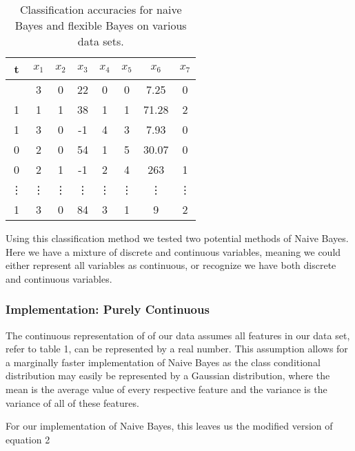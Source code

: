 \documentclass{article}
\begin{document}
\begin{table}[h]
\caption{Classification accuracies for naive Bayes and flexible 
Bayes on various data sets.}
\label{sample-table}
\vskip 0.15in
\begin{center}
\begin{small}
\begin{sc}
\begin{tabular}{|c|c|c|c|c|c|c|c|}
\hline
\abovespace\belowspace
\textbf{t} & $x_1$ & $x_2$ & $x_3$ & $x_4$ & $x_5$ & $x_6$ & $x_7$ \\
\hline
\abovespace
0 & 3 & 0 & 22 & 0 & 0 & 7.25 & 0 \\
1 & 1 & 1 & 38 & 1 & 1 & 71.28 & 2 \\
1 & 3 & 0 & -1 & 4 & 3 & 7.93 & 0 \\
0 & 2 & 0 & 54 & 1 & 5 & 30.07 & 0 \\
0 & 2 & 1 & -1 & 2 & 4 & 263 & 1 \\
\vdots & \vdots & \vdots & \vdots & \vdots & \vdots & \vdots & \vdots \\
1 & 3 & 0 & 84 & 3 & 1 & 9 & 2 \\

\hline
\end{tabular}
\end{sc}
\end{small}
\end{center}
\vskip -0.1in
\end{table}

Using this classification method we tested two potential methods of Naive Bayes. Here we have a mixture of discrete and continuous variables, meaning we could either represent all variables as continuous, or recognize we have both discrete and continuous variables. 

\subsubsection{Implementation: Purely Continuous}
The continuous representation of of our data assumes all features in our data set, refer to table 1, can be represented by a real number. This assumption allows for a marginally faster implementation of Naive Bayes as the class conditional distribution may easily be represented by a Gaussian distribution, where the mean is the average value of every respective feature and the variance is the variance of all of these features. 

For our implementation of Naive Bayes, this leaves us the modified version of equation 2
\end{document}
